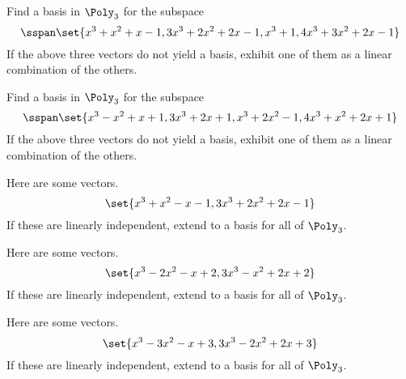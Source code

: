 \begin{enumialphparenastyle}
\begin{ex} Find a basis in $\Poly_{3}$ for the subspace 
\begin{equation*}
\sspan\set{
x^{3}+x^{2}+x-1,3x^{3}+2x^{2}+2x-1,x^{3}+1,4x^{3}+3x^{2}+2x-1}
\end{equation*}
If the above three vectors do not yield a basis, exhibit one
of them as a linear combination of the others.
\end{ex}


\begin{ex} Find a basis in $\Poly_{3}$ for the subspace 
\begin{equation*}
\sspan\set{
x^{3}-x^{2}+x+1,3x^{3}+2x+1,x^{3}+2x^{2}-1,4x^{3}+x^{2}+2x+1}
\end{equation*}
If the above three vectors do not yield a basis, exhibit one
of them as a linear combination of the others.
\end{ex}


\begin{ex} Here are some vectors.
\begin{equation*}
\set{x^{3}+x^{2}-x-1,3x^{3}+2x^{2}+2x-1}
\end{equation*}
If these are linearly independent, extend to a basis for all of $\Poly_{3}$.
\end{ex}


\begin{ex} Here are some vectors.
\begin{equation*}
\set{x^{3}-2x^{2}-x+2,3x^{3}-x^{2}+2x+2}
\end{equation*}
If these are linearly independent, extend to a basis for all of $\Poly_{3}$.
\end{ex}


\begin{ex} Here are some vectors.
\begin{equation*}
\set{x^{3}-3x^{2}-x+3,3x^{3}-2x^{2}+2x+3}
\end{equation*}
If these are linearly independent, extend to a basis for all of $\Poly_{3}$.
\end{ex}



\end{enumialphparenastyle}
